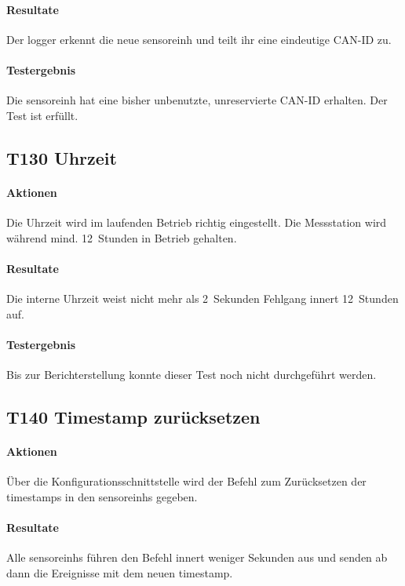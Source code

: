 \paragraph{Resultate} Der \gls{logger} erkennt die neue \gls{sensoreinh} und teilt ihr eine eindeutige CAN-ID zu.

\paragraph{Testergebnis} Die \gls{sensoreinh} hat eine bisher unbenutzte, unreservierte CAN-ID erhalten. Der Test ist erfüllt.

\subsection{T130 Uhrzeit}
\paragraph{Aktionen} Die Uhrzeit wird im laufenden Betrieb richtig eingestellt. Die Messstation wird während mind. 12~Stunden in Betrieb gehalten.

\paragraph{Resultate} Die interne Uhrzeit weist nicht mehr als 2~Sekunden Fehlgang innert 12~Stunden auf.

\paragraph{Testergebnis} Bis zur Berichterstellung konnte dieser Test noch nicht durchgeführt werden.

\subsection{T140 Timestamp zurücksetzen}
\paragraph{Aktionen} Über die Konfigurationsschnittstelle wird der Befehl zum Zurücksetzen der \gls{timestamp}s in den \glspl{sensoreinh} gegeben.

\paragraph{Resultate} Alle \glspl{sensoreinh} führen den Befehl innert weniger Sekunden aus und senden ab dann die Ereignisse mit dem neuen \gls{timestamp}.

